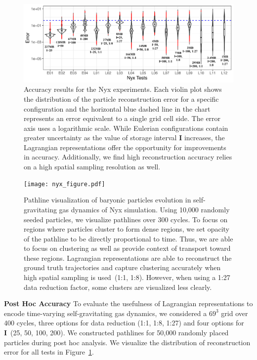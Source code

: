 \documentclass[runningheads]{llncs}
\begin{document}
\begin{figure}[!b]
\centering
\vspace{-5mm}
\includegraphics[width=\linewidth]{nyx_violinplot.pdf}
\vspace{-7mm}
\caption{Accuracy results for the Nyx experiments. Each violin plot shows the distribution of the particle reconstruction error for a specific configuration and the horizontal blue dashed line in the chart represents an error equivalent to a single grid cell side. The error axis uses a logarithmic scale. While Eulerian configurations contain greater uncertainty as the value of storage interval \textbf{I} increases, the Lagrangian representations offer the opportunity for improvements in accuracy. Additionally, we find high reconstruction accuracy relies on a high spatial sampling resolution as well.}
\label{fig:nyx_violinplot}
\end{figure}
\begin{figure}[!t]
\centering
\texttt{[image: nyx\_figure.pdf]}
\vspace{-5mm}
\caption{Pathline visualization of baryonic particles evolution in self-gravitating gas dynamics of Nyx simulation. Using 10,000 randomly seeded particles, we visualize pathlines over 300 cycles. To focus on regions where particles cluster to form dense regions, we set opacity of the pathline to be directly proportional to time. Thus, we are able to focus on clustering as well as provide context of transport toward these regions. Lagrangian representations are able to reconstruct the ground truth trajectories and capture clustering accurately when high spatial sampling is used~(1:1, 1:8). However, when using a 1:27 data reduction factor, some clusters are visualized less clearly.}
\vspace{-5mm}
\label{fig:nyx_figure}
\end{figure}
%
\noindent\textbf{Post Hoc Accuracy}
To evaluate the usefulness of Lagrangian representations to encode time-varying self-gravitating gas dynamics, we considered a $69^{3}$ grid over 400 cycles, three options for data reduction (1:1, 1:8, 1:27) and four options for \textbf{I}~(25, 50, 100, 200).
%
We constructed pathlines for 50,000 randomly placed particles during post hoc analysis.
%
We visualize the distribution of reconstruction error for all tests in Figure~\ref{fig:nyx_violinplot}.
%
\end{document}
